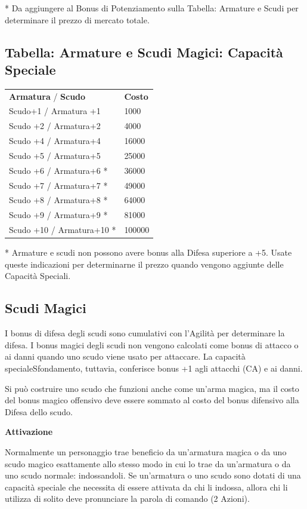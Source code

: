 \documentclass[a4paper,11pt,twoside,openany]{book}
\begin{document}
{*} Da aggiungere al Bonus di Potenziamento sulla Tabella: Armature
e Scudi per determinare il prezzo di mercato totale.


\subsection{Tabella: Armature e Scudi Magici: Capacità Speciale}

\label{tabella-armature-e-scudi-magici-capacita-speciale}

\begin{tabular}{ll}
	\toprule
	\textbf{Armatura} / \textbf{Scudo} & \textbf{Costo}\tabularnewline
	Scudo+1 / Armatura +1              & 1000\tabularnewline
	Scudo +2 / Armatura+2              & 4000\tabularnewline
	Scudo +4 / Armatura+4              & 16000\tabularnewline
	Scudo +5 / Armatura+5              & 25000\tabularnewline
	Scudo +6 / Armatura+6 {*}          & 36000\tabularnewline
	Scudo +7 / Armatura+7 {*}          & 49000\tabularnewline
	Scudo +8 / Armatura+8 {*}          & 64000\tabularnewline
	Scudo +9 / Armatura+9 {*}          & 81000\tabularnewline
	Scudo +10 / Armatura+10 {*}        & 100000\tabularnewline
\end{tabular}

{*} Armature e scudi non possono avere bonus alla Difesa superiore
a +5. Usate queste indicazioni per determinarne il prezzo quando vengono
aggiunte delle Capacità Speciali.

\subsection{Scudi Magici}

\label{scudi-magici}

I bonus di difesa degli scudi sono cumulativi con l'Agilità per determinare la difesa. I bonus magici degli scudi non vengono calcolati come bonus di attacco o ai danni quando uno scudo viene usato per attaccare. La capacità specialeSfondamento, tuttavia, conferisce bonus +1 agli attacchi (CA) e ai danni.

Si può costruire uno scudo che funzioni anche come un'arma magica, ma il costo del bonus magico offensivo deve essere sommato al costo del bonus difensivo alla Difesa dello scudo.

\textbf{Attivazione}

Normalmente un personaggio trae beneficio da un'armatura magica o da uno scudo magico esattamente allo stesso modo in cui lo trae da un'armatura o da uno scudo normale: indossandoli. Se un'armatura o uno scudo sono dotati di una capacità speciale che necessita di essere attivata da chi li indossa, allora chi li utilizza di solito deve pronunciare la parola di comando (2 Azioni).
\end{document}
